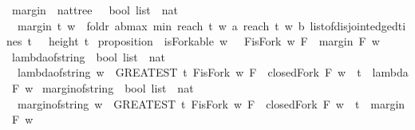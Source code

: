 \begin{isabellebody}
\isanewline
{}\isamarkupfalse%
\ margin\ {\isacharcolon}{\isacharcolon}\ {\isachardoublequoteopen}nattree\ {\isasymRightarrow}\ \ bool\ list\ {\isasymRightarrow}\ nat{\isachardoublequoteclose}\ \isanewline
\ \ {\isachardoublequoteopen}margin\ t\ w\ {\isacharequal}\ foldr\ {\isacharparenleft}{\isasymlambda}{\isacharparenleft}a{\isacharcomma}b{\isacharparenright}{\isachardot}max\ {\isacharparenleft}min\ {\isacharparenleft}reach\ t\ w\ a{\isacharparenright}\ {\isacharparenleft}reach\ t\ w\ b{\isacharparenright}{\isacharparenright}{\isacharparenright}\ {\isacharparenleft}list{\isacharunderscore}of{\isacharunderscore}disjoint{\isacharunderscore}edged{\isacharunderscore}tines\ t{\isacharparenright}\ {\isacharparenleft}{}\ {\isacharminus}\ {\isacharparenleft}height\ t{\isacharparenright}{\isacharparenright}{\isachardoublequoteclose}\isanewline
\isanewline
{}\isamarkupfalse%
\ proposition{\isacharunderscore}{}{\isacharunderscore}{}{}\ {\isacharcolon}\ {\isachardoublequoteopen}isForkable\ w\ {\isasymlongleftrightarrow}\ {\isacharparenleft}{\isasymexists}\ F{\isachardot}{\isacharparenleft}isFork\ w\ F\ {\isasymand}\ margin\ F\ w\ {\isasymge}\ {}{\isacharparenright}{\isacharparenright}{\isachardoublequoteclose}\ \isanewline
%
\isadelimproof
\ %
\endisadelimproof
%
\isatagproof
{}\isamarkupfalse%
%
\endisatagproof
{\isafoldproof}%
%
\isadelimproof
\isanewline
%
\endisadelimproof
\isanewline
{}\isamarkupfalse%
\ lambda{\isacharunderscore}of{\isacharunderscore}string\ {\isacharcolon}{\isacharcolon}\ {\isachardoublequoteopen}bool\ list\ {\isasymRightarrow}\ nat{\isachardoublequoteclose}\ \ \ \ \isanewline
\ \ {\isachardoublequoteopen}lambda{\isacharunderscore}of{\isacharunderscore}string\ w\ {\isacharequal}\ {\isacharparenleft}GREATEST\ t{\isachardot}\ {\isacharparenleft}{\isasymexists}F{\isachardot}{\isacharparenleft}isFork\ w\ F\ {\isasymand}\ closedFork\ F\ w\ {\isasymand}\ t\ {\isacharequal}\ lambda\ F\ w{\isacharparenright}{\isacharparenright}{\isacharparenright}{\isachardoublequoteclose}\isanewline
\isanewline
{}\isamarkupfalse%
\ margin{\isacharunderscore}of{\isacharunderscore}string\ {\isacharcolon}{\isacharcolon}\ {\isachardoublequoteopen}bool\ list\ {\isasymRightarrow}\ nat{\isachardoublequoteclose}\ \isanewline
\ \ {\isachardoublequoteopen}margin{\isacharunderscore}of{\isacharunderscore}string\ w\ {\isacharequal}\ {\isacharparenleft}GREATEST\ t{\isachardot}\ {\isacharparenleft}{\isasymexists}F{\isachardot}{\isacharparenleft}isFork\ w\ F\ {\isasymand}\ closedFork\ F\ w\ {\isasymand}\ t\ {\isacharequal}\ margin\ F\ w{\isacharparenright}{\isacharparenright}{\isacharparenright}{\isachardoublequoteclose}\isanewline

\end{isabellebody}
